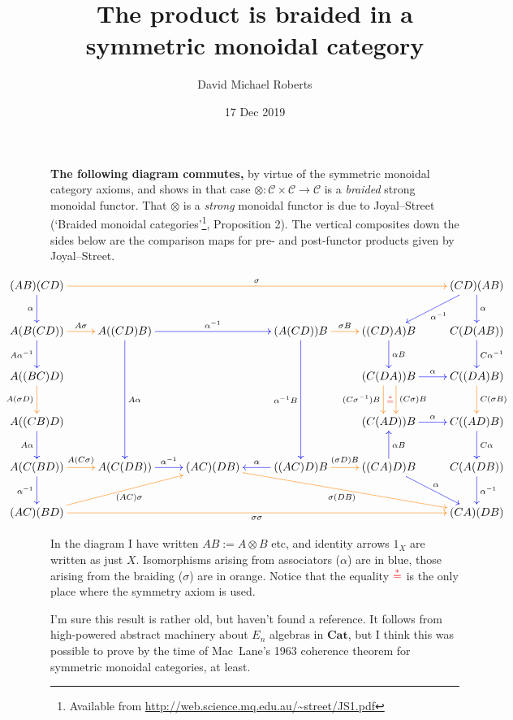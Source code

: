 \documentclass{amsart}
\begin{document}
\title{The product is braided in a symmetric monoidal category}
\author{David Michael Roberts}
\date{17 Dec 2019}

\maketitle

\noindent
\textbf{The following diagram commutes,} by virtue of the symmetric monoidal category axioms, and shows in that case $\otimes\colon \mathcal{C} \times \mathcal{C} \to \mathcal{C}$ is a \emph{braided} strong monoidal functor. That $\otimes$ is a \emph{strong} monoidal functor is due to Joyal--Street (`Braided monoidal categories'\footnote{Available from \url{http://web.science.mq.edu.au/~street/JS1.pdf}}, Proposition 2). The vertical composites down the sides below are the comparison maps for pre- and post-functor products given by Joyal--Street.
\bigskip

\[\centerline{
	\xymatrix{
	(AB)(CD) \ar@[orange][rrrrr]^\sigma \ar@[blue][d]_\alpha &
	&&&& 
	\ar@[blue][d]^\alpha (CD)(AB) \ar@[blue][dl]^{\alpha^{-1}}\\
	A(B(CD))\ar@[blue][d]_{A\alpha^{-1}} \ar@[orange][r]^{A\sigma}& 
	A((CD)B)\ar@[blue][ddd]^{A\alpha} \ar@[blue][rr]^{\alpha^{-1}}&
	& 
	(A(CD))B\ar@[blue][ddd]_{\alpha^{-1}B} \ar@[orange][r]^{\sigma B}&
	((CD)A)B \ar@[blue][d]^{\alpha B}  & 
	C(D(AB)) \ar@[blue][d]^{C\alpha^{-1}}\\
	A((BC)D)\ar@[orange][d]_{A(\sigma D)}&
	&&& 
	(C(DA))B \ar@[orange]@<1.5ex>[d]^{(C\sigma)B} 
		\ar@[orange]@<-1.1ex>[d]^{\color{red}\stackrel{\ast}{=}}_{(C\sigma^{-1})B} 
		\ar@[blue][r]^\alpha &
	C((DA)B) \ar@[orange][d]^{C(\sigma B)}\\
	A((CB)D)\ar@[blue][d]_{A\alpha}&
	&&& 
	(C(AD))B \ar@[blue][r]^\alpha& C((AD)B)\ar@[blue][d]^{C\alpha}\\
	A(C(BD))\ar@[blue][d]_{\alpha^{-1}}\ar@[orange][r]^{A(C\sigma)}&
	A(C(DB))\ar@[blue][r]^{\alpha^{-1}} & (AC)(DB)\ar@[orange][drrr]_{\sigma(DB)} & 
	((AC)D)B \ar@[blue][l]_\alpha \ar@[orange][r]^{(\sigma D)B} &
	((CA)D)B \ar@[blue][dr]^\alpha \ar@[blue][u]_{\alpha B}& 
	C(A(DB))\ar@[blue][d]^{\alpha^{-1}}\\
	(AC)(BD)\ar@[orange][rrrrr]_{\sigma \sigma} \ar@[orange][urr]_{(AC)\sigma} &
	&&&&  
	(CA)(DB)
	}
	}
\]
\bigskip

\noindent
In the diagram I have written $AB:= A\otimes B$ etc, and identity arrows $1_X$ are written as just $X$. 
Isomorphisms arising from associators ($\alpha$) are in blue, those arising from the braiding ($\sigma$) are in orange.
Notice that the equality $\color{red}\stackrel{\ast}{=}$ is the only place where the symmetry axiom is used.

\medskip

\noindent
I'm sure this result is rather old, but haven't found a reference. It follows from high-powered abstract machinery about $E_n$ algebras in $\mathbf{Cat}$, but I think this was possible to prove by the time of Mac~Lane's 1963 coherence theorem for symmetric monoidal categories, at least.
\end{document}
